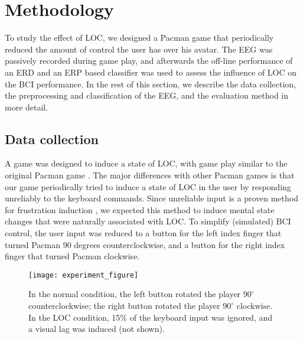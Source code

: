 \section{Methodology}
To study the effect of \acf{LOC}, we designed a Pacman game that periodically
reduced the amount of control the user has over his avatar.
The \ac{EEG} was passively recorded during game play, and afterwards the
off-line performance of an \ac{ERD} and an \ac{ERP} based classifier was used to
assess the influence of \ac{LOC} on the \ac{BCI} performance. In the rest of
this section, we describe the data collection, the preprocessing and
classification of the \ac{EEG}, and the evaluation method in more detail.

\subsection{Data collection}
A game was designed to induce a state of \ac{LOC}, with game play similar to
the original Pacman game \cite{reuderink2009apf}. The major differences with
other Pacman games is that our game periodically tried to induce a state of
\ac{LOC} in the user by responding unreliably to the keyboard commands. Since
unreliable input is a proven method for frustration induction
\cite{scheirer2002fup, klein2002cru, diener2006eaa}, we expected this method to
induce mental state changes that were naturally associated with \ac{LOC}.
%
To simplify (simulated) \ac{BCI} control, the user input was reduced to a
button for the left index finger that turned Pacman 90 degrees counterclockwise,
and a button for the right index finger that turned Pacman clockwise. 

\begin{figure}
  \centering
  \texttt{[image: experiment\_figure]}
  \caption{In the normal condition, the left button rotated the player
  $90^{\circ}$ counterclockwise; the right button rotated the player
  $90^{\circ}$ clockwise. In the \protect\ac{LOC} condition, 15\% of the
  keyboard input was ignored, and a visual lag was induced (not shown).}
  \label{fig:experiment_concept} 
\end{figure}

